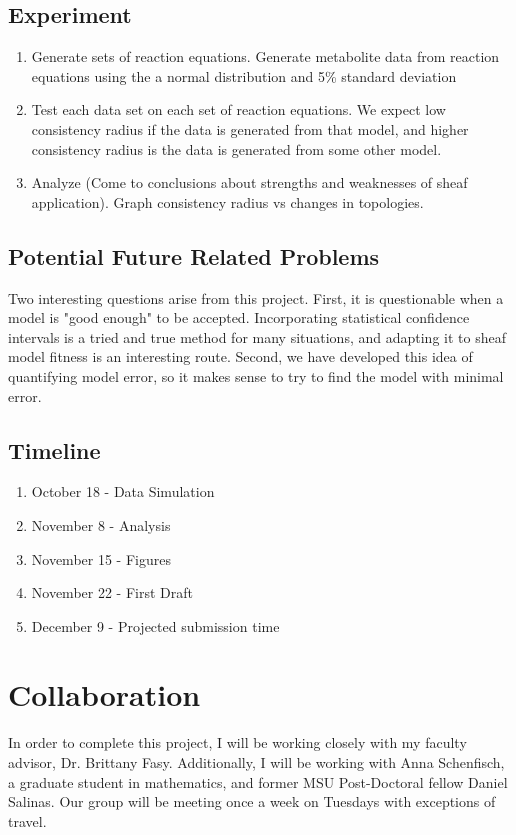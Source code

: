 \documentclass[10.5pt]{article}
\begin{document}
\subsection{Experiment}
\begin{enumerate}
	\item Generate sets of reaction equations. Generate metabolite data from 
	reaction equations using the a normal distribution and 5\% standard 
	deviation
	\item Test each data set on each set of reaction equations. We expect low 
	consistency radius if the data is generated from that model, and higher 
	consistency radius is the data is generated from some other model.
	\item Analyze (Come to conclusions about strengths and weaknesses of sheaf 
	application). Graph consistency radius vs changes in topologies.
\end{enumerate}
\subsection{Potential Future Related Problems}
Two interesting questions arise from this project. First, it is questionable 
when a model is "good enough" to be accepted. Incorporating statistical 
confidence intervals is a tried and true method for many situations, and 
adapting it to sheaf model fitness is an interesting route. Second, we have 
developed this idea of quantifying model error, so it makes sense to try to 
find the model with minimal error. 
\subsection{Timeline}
\begin{enumerate}
	\item October 18 - Data Simulation
	\item November 8 - Analysis
	\item November 15 - Figures
	\item November 22 - First Draft
	\item December 9 - Projected submission time
\end{enumerate}

\section{Collaboration}
In order to complete this project, I will be working closely with my faculty advisor, Dr. Brittany Fasy. Additionally, I will be working with Anna Schenfisch, a graduate student in mathematics, and former MSU Post-Doctoral fellow Daniel Salinas. Our group will be meeting once a week on Tuesdays with exceptions of travel. 
\end{document}
